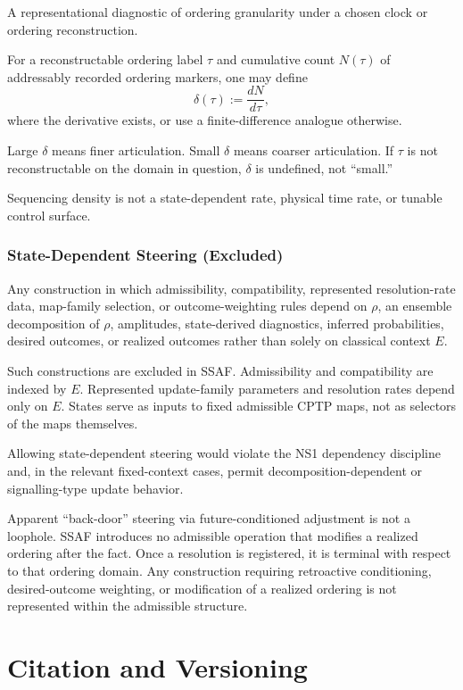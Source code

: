 \documentclass[aps,prx,onecolumn,11pt]{revtex4-2}
\theoremstyle{plain}
\theoremstyle{definition}
\theoremstyle{remark}
\begin{document}
A representational diagnostic of ordering granularity under a chosen
clock or ordering reconstruction.

For a reconstructable ordering label \(\tau\) and cumulative count
\(N(\tau)\) of addressably recorded ordering markers, one may define
\[
\delta(\tau)
:=
\frac{dN}{d\tau},
\]
where the derivative exists, or use a finite-difference analogue
otherwise.

Large \(\delta\) means finer articulation. Small \(\delta\) means
coarser articulation. If \(\tau\) is not reconstructable on the domain
in question, \(\delta\) is undefined, not ``small.''

Sequencing density is not a state-dependent rate, physical time rate,
or tunable control surface.

\subsubsection*{State-Dependent Steering (Excluded)}

Any construction in which admissibility, compatibility, represented
resolution-rate data, map-family selection, or outcome-weighting rules
depend on \(\rho\), an ensemble decomposition of \(\rho\), amplitudes,
state-derived diagnostics, inferred probabilities, desired outcomes, or
realized outcomes rather than solely on classical context \(E\).

Such constructions are excluded in SSAF. Admissibility and
compatibility are indexed by \(E\). Represented update-family
parameters and resolution rates depend only on \(E\). States serve as
inputs to fixed admissible CPTP maps, not as selectors of the maps
themselves.

Allowing state-dependent steering would violate the NS1 dependency
discipline and, in the relevant fixed-context cases, permit
decomposition-dependent or signalling-type update behavior.

Apparent ``back-door'' steering via future-conditioned adjustment is
not a loophole. SSAF introduces no admissible operation that modifies a
realized ordering after the fact. Once a resolution is registered, it
is terminal with respect to that ordering domain. Any construction
requiring retroactive conditioning, desired-outcome weighting, or
modification of a realized ordering is not represented within the
admissible structure.

\clearpage
\section*{Citation and Versioning}
\end{document}

